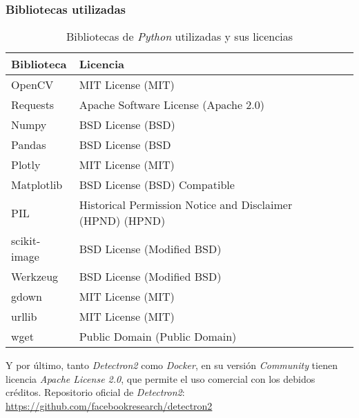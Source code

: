 \clearpage

\subsubsection{Bibliotecas utilizadas}
\begin{table}[h]
	\begin{center}
		\begin{tabular}{>{\centering\arraybackslash}m{5cm} >{\centering\arraybackslash}m{5cm} p{9cm}}
			\textbf{Biblioteca} & \textbf{Licencia}\\ \hline \hline
			OpenCV & MIT License (MIT)\\ \hline
			Requests & Apache Software License (Apache 2.0)\\ \hline
			Numpy & BSD License (BSD)\\ \hline
			Pandas & BSD License (BSD\\ \hline
			Plotly & MIT License (MIT)\\ \hline
			Matplotlib & BSD License (BSD) Compatible\\ \hline
			PIL & Historical Permission Notice and Disclaimer (HPND) (HPND)\\ \hline
			scikit-image & BSD License (Modified BSD)\\ \hline
			Werkzeug & BSD License (Modified BSD)\\ \hline
			gdown & MIT License (MIT)\\ \hline
			urllib & MIT License (MIT)\\ \hline
			wget & Public Domain (Public Domain)\\ \hline
		\end{tabular}
		\caption{Bibliotecas de \emph{Python} utilizadas y sus licencias}
		\label{Licencias}
	\end{center}
\end{table}

Y por último, tanto \emph{Detectron2} como \emph{Docker}, en su versión \emph{Community} tienen licencia \emph{Apache License 2.0}, que permite el uso comercial con los debidos créditos. Repositorio oficial de \emph{Detectron2}: \url{https://github.com/facebookresearch/detectron2}